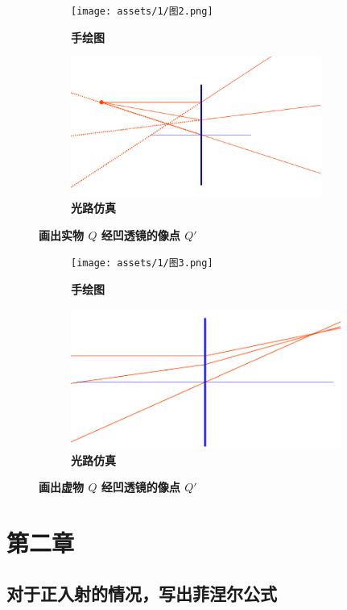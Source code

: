 \documentclass[UTF8]{report}
\theoremstyle{MyLineTheoremStyle} %
\theoremstyle{MyBlockTheoremStyle} %
\theoremstyle{MySubsubsectionStyle} %
\begin{document}
\begin{figure}[H]\centering
    \begin{subfigure}[t]{0.47\textwidth}\centering
        \texttt{[image: assets/1/图2.png]}
        \caption{\bfseries 手绘图 }
    \end{subfigure}\begin{subfigure}[t]{0.52\textwidth}\centering
        \includegraphics[height=130pt]{assets/1/2.png}
        \caption{\bfseries 光路仿真 }
    \end{subfigure}
    \caption{\bfseries 画出实物 $Q$ 经凹透镜的像点 $Q'$}
\end{figure}

    \begin{figure}[H]\centering
\begin{subfigure}[t]{0.47\textwidth}\centering
    \texttt{[image: assets/1/图3.png]}
    \caption{\bfseries 手绘图 }
\end{subfigure}\begin{subfigure}[t]{0.52\textwidth}\centering
    \includegraphics[height=130pt]{assets/1/3.png}
    \caption{\bfseries 光路仿真 }
\end{subfigure}
\caption{\bfseries 画出虚物 $Q$ 经凹透镜的像点 $Q'$}
\end{figure}



\chapter{第二章}\thispagestyle{fancy}
\vspace{-2mm}
\section{对于正入射的情况，写出菲涅尔公式}
\end{document}

